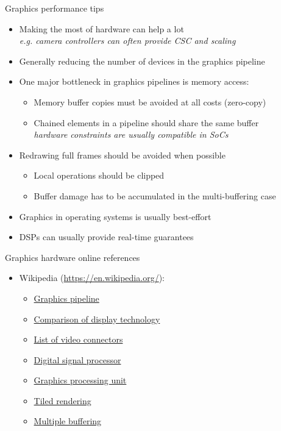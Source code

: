\begin{frame}{Graphics performance tips}
  \begin{itemize}
  \item Making the most of hardware can help a lot\\
    \textit{e.g. camera controllers can often provide CSC and scaling}
  \item Generally reducing the number of devices in the graphics pipeline
  \item One major bottleneck in graphics pipelines is memory access:
    \begin{itemize}
    \item Memory buffer copies must be avoided at all costs (zero-copy)
    \item Chained elements in a pipeline should share the same buffer\\
      \textit{hardware constraints are usually compatible in SoCs}
    \end{itemize}
  \item Redrawing full frames should be avoided when possible
    \begin{itemize}
    \item Local operations should be clipped
    \item Buffer damage has to be accumulated in the multi-buffering case
    \end{itemize}
  \item Graphics in operating systems is usually best-effort
  \item DSPs can usually provide real-time guarantees
  \end{itemize}
\end{frame}

\begin{frame}{Graphics hardware online references}
  \small
  \begin{itemize}
  \item Wikipedia (\url{https://en.wikipedia.org/}):
    \begin{itemize}
    \item \href{https://en.wikipedia.org/wiki/Graphics_pipeline}{Graphics pipeline}
    \item \href{https://en.wikipedia.org/wiki/Comparison_of_display_technology}{Comparison of display technology}
    \item \href{https://en.wikipedia.org/wiki/List_of_video_connectors}{List of video connectors}
    \item \href{https://en.wikipedia.org/wiki/Digital_signal_processor}{Digital signal processor}
    \item \href{https://en.wikipedia.org/wiki/Graphics_processing_unit}{Graphics processing unit}
    \item \href{https://en.wikipedia.org/wiki/Tiled_rendering}{Tiled rendering}
    \item \href{https://en.wikipedia.org/wiki/Multiple_buffering}{Multiple buffering}
    \end{itemize}
  \end{itemize}
\end{frame}

